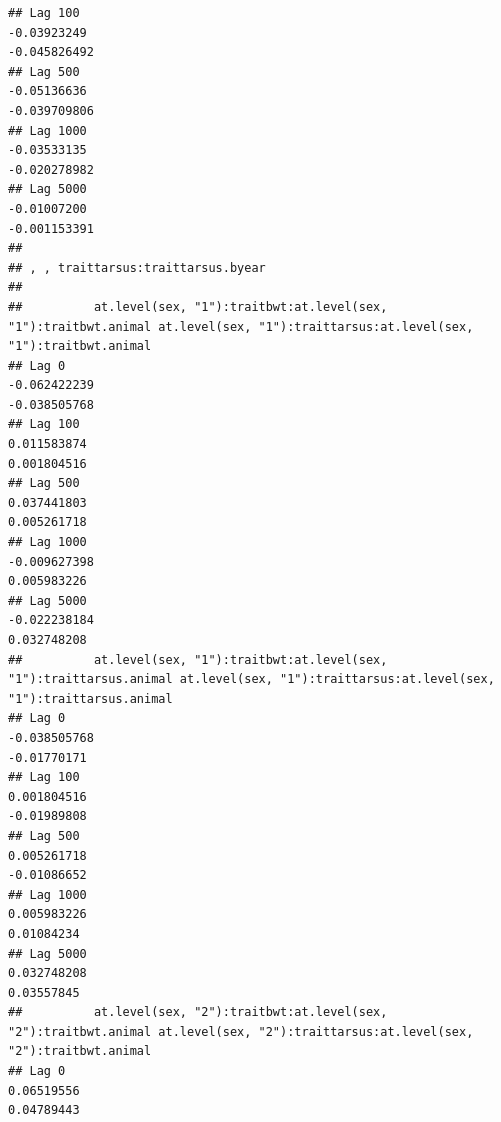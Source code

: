 \documentclass[
  12pt,
]{book}
\begin{document}
\begin{verbatim}
## Lag 100                                                       -0.03923249                                                        -0.045826492
## Lag 500                                                       -0.05136636                                                        -0.039709806
## Lag 1000                                                      -0.03533135                                                        -0.020278982
## Lag 5000                                                      -0.01007200                                                        -0.001153391
## 
## , , traittarsus:traittarsus.byear
## 
##          at.level(sex, "1"):traitbwt:at.level(sex, "1"):traitbwt.animal at.level(sex, "1"):traittarsus:at.level(sex, "1"):traitbwt.animal
## Lag 0                                                      -0.062422239                                                      -0.038505768
## Lag 100                                                     0.011583874                                                       0.001804516
## Lag 500                                                     0.037441803                                                       0.005261718
## Lag 1000                                                   -0.009627398                                                       0.005983226
## Lag 5000                                                   -0.022238184                                                       0.032748208
##          at.level(sex, "1"):traitbwt:at.level(sex, "1"):traittarsus.animal at.level(sex, "1"):traittarsus:at.level(sex, "1"):traittarsus.animal
## Lag 0                                                         -0.038505768                                                          -0.01770171
## Lag 100                                                        0.001804516                                                          -0.01989808
## Lag 500                                                        0.005261718                                                          -0.01086652
## Lag 1000                                                       0.005983226                                                           0.01084234
## Lag 5000                                                       0.032748208                                                           0.03557845
##          at.level(sex, "2"):traitbwt:at.level(sex, "2"):traitbwt.animal at.level(sex, "2"):traittarsus:at.level(sex, "2"):traitbwt.animal
## Lag 0                                                        0.06519556                                                        0.04789443

\end{verbatim}
\end{document}
